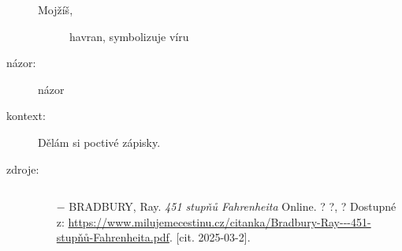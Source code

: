 \documentclass{article}
\begin{document}
\begin{description}
\begin{description}
            \item[Mojžíš,] havran, symbolizuje víru
        \end{description}
    \item[názor:] názor
    \item[kontext:]  Dělám si poctivé zápisky.
    \item[zdroje:] $ $
    \begin{itemize}
        \setlength\itemsep{0em}
        \item[$-$] BRADBURY, Ray. \textit{451 stupňů Fahrenheita} Online. ? ?, ? Dostupné z: \url{https://www.milujemecestinu.cz/citanka/Bradbury-Ray---451-stupňů-Fahrenheita.pdf}. [cit. 2025-03-2].
    \end{itemize}
\end{description}
\end{document}
